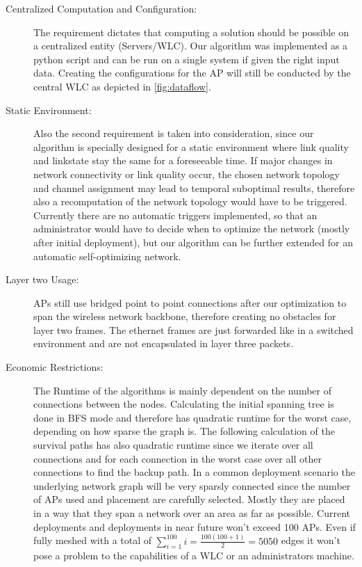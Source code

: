 \begin{description}
	\item[Centralized Computation and Configuration:]
	  The requirement dictates that computing a solution should be possible on a centralized entity (Servers/WLC).
	  Our algorithm was implemented as a python script and can be run on a single system if given the right input data.
	  Creating the configurations for the AP will still be conducted by the central WLC as depicted in \ref{fig:dataflow}.
	  
	\item[Static Environment:]
	  Also the second requirement is taken into consideration, since our algorithm is specially designed for a static environment where link quality 
	  and linkstate stay the same for a foreseeable time.
	  If major changes in network connectivity or link quality occur, the chosen network topology and channel assignment
	  may lead to temporal suboptimal results, therefore also a recomputation of the network topology would have to be triggered.
	  Currently there are no automatic triggers implemented, so that an administrator would have to decide when to optimize the network (mostly after initial deployment),
	  but our algorithm can be further extended for an automatic self-optimizing network.
	  
	\item[Layer two Usage:]
	  APs still use bridged point to point connections after our optimization to span the wireless network backbone, therefore creating no obstacles for layer two frames.
	  The ethernet frames are just forwarded like in a switched environment and are not encapsulated in layer three packets.
	  
	\item[Economic Restrictions:]
	  The Runtime of the algorithms is mainly dependent on the number of connections between the nodes. Calculating the initial spanning tree is done in \ac{BFS} mode and 
	  therefore has quadratic runtime for the worst case, depending on how sparse the graph is. The following calculation of the survival paths has also quadratic runtime 
	  since we iterate over all connections and for each connection in the worst case over all other connections to find the backup path.
	  In a common deployment scenario the underlying network graph will be very sparsly connected since the number of APs used and placement are carefully selected.
	  Mostly they are placed in a way that they span a network over an area as far as possible.
	  Current deployments and deployments in near future won't exceed 100 APs. 
	  Even if fully meshed with a total of \(\sum \limits_{i=1}^{100} i = \frac{100(100+1)}{2}=5050\)
	  edges it won't pose a problem to the capabilities of a WLC or an administrators machine.
	  
      \end{description}
      
